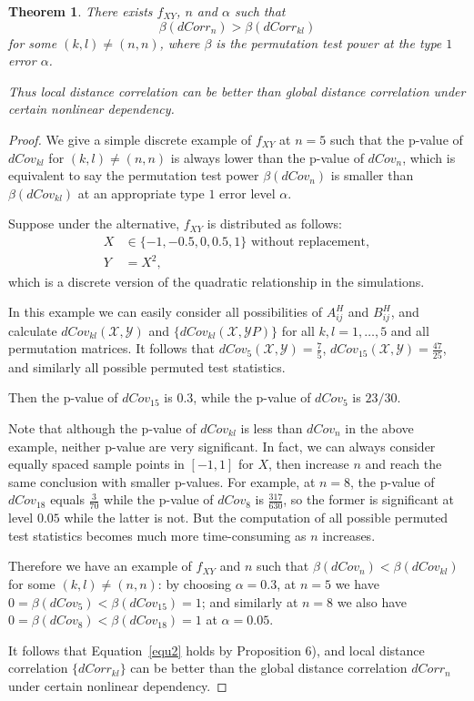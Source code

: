 \documentclass[12pt]{article}
\newtheorem{thm}{Theorem}
\begin{document}
\begin{thm}
\label{thm3}
There exists $f_{XY}$, $n$ and $\alpha$ such that 
\begin{equation}
\label{equ2}
\beta(dCorr_{n}) > \beta(dCorr_{kl})
\end{equation}
for some $(k,l) \neq (n,n)$, where $\beta$ is the permutation test power at the type $1$ error $\alpha$.

Thus local distance correlation can be better than global distance correlation under certain nonlinear dependency.
\end{thm}
\begin{proof}
We give a simple discrete example of $f_{XY}$ at $n=5$ such that the p-value of $dCov_{kl}$ for $(k,l) \neq (n,n)$ is always lower than the p-value of $dCov_{n}$, which is equivalent to say the permutation test power $\beta(dCov_{n})$ is smaller than $\beta(dCov_{kl})$ at an appropriate type $1$ error level $\alpha$.

Suppose under the alternative, $f_{XY}$ is distributed as follows:
\begin{align*} 
X &\in \{-1,-0.5,0,0.5,1\} \mbox{ without replacement}, \\
Y &= X^2,
\end{align*}
which is a discrete version of the quadratic relationship in the simulations.

In this example we can easily consider all possibilities of $A^{H}_{ij}$ and $B^{H}_{ij}$, and calculate $dCov_{kl}(\mathcal{X}, \mathcal{Y})$ and $\{dCov_{kl}(\mathcal{X}, \mathcal{Y}P)\}$ for all $k,l=1,\ldots,5$ and all permutation matrices. It follows that $dCov_{5}(\mathcal{X}, \mathcal{Y})=\frac{7}{5}$, $dCov_{15}(\mathcal{X}, \mathcal{Y})=\frac{47}{25}$, and similarly all possible permuted test statistics.

Then the p-value of $dCov_{15}$ is $0.3$, while the p-value of $dCov_{5}$ is $23/30$. 

Note that although the p-value of $dCov_{kl}$ is less than $dCov_{n}$ in the above example, neither p-value are very significant. In fact, we can always consider equally spaced sample points in $[-1,1]$ for $X$, then increase $n$ and reach the same conclusion with smaller p-values. For example, at $n=8$, the p-value of $dCov_{18}$ equals $\frac{3}{70}$ while the p-value of $dCov_{8}$ is $\frac{317}{630}$, so the former is significant at level $0.05$ while the latter is not. But the computation of all possible permuted test statistics becomes much more time-consuming as $n$ increases.

Therefore we have an example of $f_{XY}$ and $n$ such that $\beta(dCov_{n}) < \beta(dCov_{kl})$ for some $(k,l) \neq (n,n)$: by choosing $\alpha=0.3$, at $n=5$ we have $0=\beta(dCov_{5}) < \beta(dCov_{15})=1$; and similarly at $n=8$ we also have $0=\beta(dCov_{8}) < \beta(dCov_{18})=1$ at $\alpha=0.05$.

It follows that Equation~\ref{equ2} holds by Proposition 6), and local distance correlation $\{dCorr_{kl}\}$ can be better than the global distance correlation $dCorr_{n}$ under certain nonlinear dependency. 
\end{proof}
\end{document}
